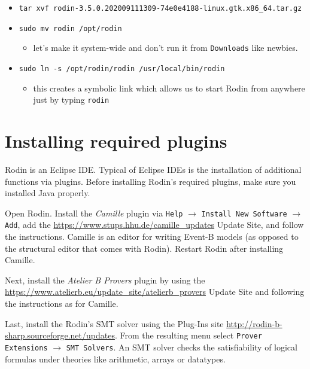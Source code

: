 \documentclass{article} %
\newcommand{\eb}{\textsf{Event-B}\xspace}
\begin{document}
\begin{itemize}    
    \item \texttt{tar xvf rodin-3.5.0.202009111309-74e0e4188-linux.gtk.x86\_64.tar.gz}
    \item \texttt{sudo mv rodin /opt/rodin}
    \begin{itemize}
        \item let's make it system-wide and don't run it from \texttt{Downloads} like newbies.
    \end{itemize}
    \item \texttt{sudo ln -s /opt/rodin/rodin /usr/local/bin/rodin}
    \begin{itemize}
        \item this creates a symbolic link which allows us to start Rodin from anywhere just by typing \texttt{rodin}
    \end{itemize}
\end{itemize}



\section{Installing required plugins}
\label{subsec_plugins}

Rodin is an Eclipse IDE. Typical of Eclipse IDEs is the installation of additional functions via plugins. Before installing Rodin's required plugins, make sure you installed Java properly.

Open Rodin. Install the \emph{Camille} plugin via \texttt{Help} $\rightarrow$ \texttt{Install New Software} $\rightarrow$ \texttt{Add}, add the \href{https://www.stups.hhu.de/camille_updates} {https://\-www.\-stups.\-hhu.\-de/\-camille\_\-updates} Update Site, and follow the instructions. Camille is an editor for writing \eb models (as opposed to the structural editor that comes with Rodin). Restart Rodin after installing Camille.

Next, install the \emph{Atelier B Provers} plugin by using the \href{https://www.atelierb.eu/update_site/atelierb_provers} {https://\-www.\-atelierb.\-eu/\-update\_\-site/atelierb\_\-provers} Update Site and following the instructions as for Camille.

Last, install the Rodin's SMT solver using the Plug-Ins site \href{http://rodin-b-sharp.sourceforge.net/updates} {http://\-rodin-\-b-\-sharp.\-source\-forge.\-net/\-updates}. From the resulting menu select \texttt{Prover Extensions} $\rightarrow$ \texttt{SMT Solvers}. An SMT solver checks the satisfiability of logical formulas under theories like arithmetic, arrays or datatypes. 
\end{document}
